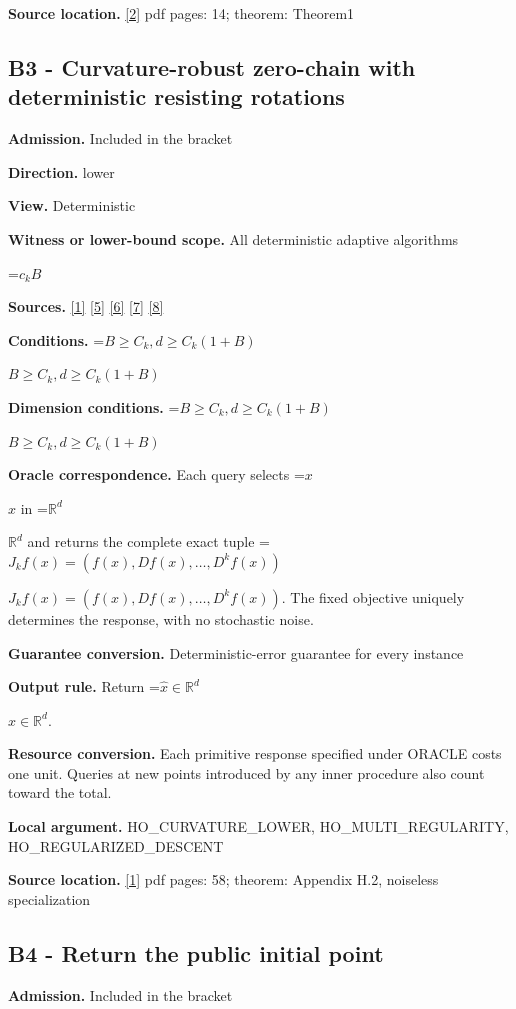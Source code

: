 \documentclass[10pt,a4paper]{article}
\newcommand{\AtlasMath}[1]{\par\begingroup\centering\setbox0=\hbox{$\displaystyle #1$}\ifdim\wd0>1.4\linewidth\typeout{ATLAS WIDE FORMULA: \the\wd0}\fi\ifdim\wd0>\linewidth\resizebox{\linewidth}{!}{\box0}\else\box0\fi\par\endgroup}
\newcommand{\AtlasInlineMath}[1]{\begingroup\setbox0=\hbox{$#1$}\ifdim\wd0>.4\linewidth\endgroup\AtlasMath{#1}\else\endgroup$#1$\fi}
\begin{document}
\textbf{Source location.} \href{https://arxiv.org/abs/1710.11606}{[2]} pdf pages: 14; theorem: Theorem1

\subsection{B3 - Curvature-robust zero-chain with deterministic resisting rotations}
\textbf{Admission.} Included in the bracket

\textbf{Direction.} lower

\textbf{View.} Deterministic

\textbf{Witness or lower-bound scope.} All deterministic adaptive algorithms

\AtlasMath{c_k B}
\textbf{Sources.} \href{https://proceedings.mlr.press/v125/arjevani20a/arjevani20a.pdf}{[1]} \href{https://proceedings.mlr.press/v125/arjevani20a/arjevani20a.pdf}{[5]} \href{https://arxiv.org/abs/2610.16832}{[6]} \href{https://arxiv.org/abs/1710.11606v3}{[7]} \href{https://optimization-online.org/wp-content/uploads/2015/06/4970.pdf}{[8]}

\textbf{Conditions.} \AtlasInlineMath{B\ge C_k,d\ge C_k(1+B)}

\textbf{Dimension conditions.} \AtlasInlineMath{B\ge C_k,d\ge C_k(1+B)}

\textbf{Oracle correspondence.} Each query selects \AtlasInlineMath{x} in \AtlasInlineMath{\mathbb{R}^d} and returns the complete exact tuple \AtlasInlineMath{J_{k}f(x)=(f(x),Df(x),\ldots,D^{k}f(x))}. The fixed objective uniquely determines the response, with no stochastic noise.

\textbf{Guarantee conversion.} Deterministic-error guarantee for every instance

\textbf{Output rule.} Return \AtlasInlineMath{\widehat{x}\in \mathbb{R}^d}.

\textbf{Resource conversion.} Each primitive response specified under ORACLE costs one unit. Queries at new points introduced by any inner procedure also count toward the total.

\textbf{Local argument.} HO\_\allowbreak{}CURVATURE\_\allowbreak{}LOWER, HO\_\allowbreak{}MULTI\_\allowbreak{}REGULARITY, HO\_\allowbreak{}REGULARIZED\_\allowbreak{}DESCENT

\textbf{Source location.} \href{https://proceedings.mlr.press/v125/arjevani20a/arjevani20a.pdf}{[1]} pdf pages: 58; theorem: Appendix H.2, noiseless specialization

\subsection{B4 - Return the public initial point}
\textbf{Admission.} Included in the bracket
\end{document}
